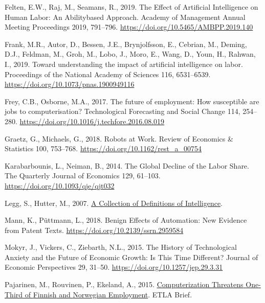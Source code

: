 \documentclass[
  11,
  a4paperpaper,
]{article}
\newlength{\cslhangindent}
\newenvironment{CSLReferences}[2] %
 {\begin{list}{}{%
  \setlength{\itemindent}{0pt}
  \setlength{\leftmargin}{0pt}
  \setlength{\parsep}{0pt}
  \ifodd #1
   \setlength{\leftmargin}{\cslhangindent}
   \setlength{\itemindent}{-1\cslhangindent}
  \fi
  \setlength{\itemsep}{#2\baselineskip}}}
 {\end{list}}
\begin{document}
\begin{CSLReferences}{1}{0}
Felten, E.W., Raj, M., Seamans, R., 2019. The {Effect} of {Artificial}
{Intelligence} on {Human} {Labor}: {An} {Abilitybased} {Approach}.
Academy of Management Annual Meeting Proceedings 2019, 791--796.
\url{https://doi.org/10.5465/AMBPP.2019.140}

Frank, M.R., Autor, D., Bessen, J.E., Brynjolfsson, E., Cebrian, M.,
Deming, D.J., Feldman, M., Groh, M., Lobo, J., Moro, E., Wang, D., Youn,
H., Rahwan, I., 2019. Toward understanding the impact of artificial
intelligence on labor. Proceedings of the National Academy of Sciences
116, 6531--6539. \url{https://doi.org/10.1073/pnas.1900949116}

Frey, C.B., Osborne, M.A., 2017. The future of employment: {How}
susceptible are jobs to computerisation? Technological Forecasting and
Social Change 114, 254--280.
\url{https://doi.org/10.1016/j.techfore.2016.08.019}

Graetz, G., Michaels, G., 2018. Robots at {Work}. Review of Economics \&
Statistics 100, 753--768. \url{https://doi.org/10.1162/rest_a_00754}

Karabarbounis, L., Neiman, B., 2014. The {Global} {Decline} of the
{Labor} {Share}. The Quarterly Journal of Economics 129, 61--103.
\url{https://doi.org/10.1093/qje/qjt032}

Legg, S., Hutter, M., 2007. \href{http://arxiv.org/abs/0706.3639}{A
{Collection} of {Definitions} of {Intelligence}}.

Mann, K., Püttmann, L., 2018. Benign {Effects} of {Automation}: {New}
{Evidence} from {Patent} {Texts}.
\url{https://doi.org/10.2139/ssrn.2959584}

Mokyr, J., Vickers, C., Ziebarth, N.L., 2015. The {History} of
{Technological} {Anxiety} and the {Future} of {Economic} {Growth}: {Is}
{This} {Time} {Different}? Journal of Economic Perspectives 29, 31--50.
\url{https://doi.org/10.1257/jep.29.3.31}

Pajarinen, M., Rouvinen, P., Ekeland, A., 2015.
\href{https://ideas.repec.org//p/rif/briefs/34.html}{Computerization
{Threatens} {One}-{Third} of {Finnish} and {Norwegian} {Employment}}.
ETLA Brief.


\end{CSLReferences}
\end{document}
